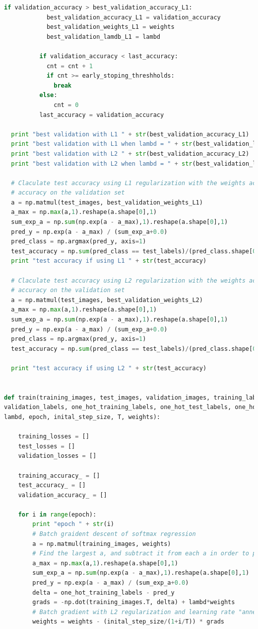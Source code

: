 \documentclass{article} %
\begin{document}
{\begin{lstlisting}[language=Python]
		  if validation_accuracy > best_validation_accuracy_L1:
			best_validation_accuracy_L1 = validation_accuracy
			best_validation_weights_L1 = weights
			best_validation_lamdb_L1 = lambd

		  if validation_accuracy < last_accuracy:
			cnt = cnt + 1
			if cnt >= early_stoping_threshholds:
			  break
		  else:
			  cnt = 0
		  last_accuracy = validation_accuracy

  print "best validation with L1 " + str(best_validation_accuracy_L1)
  print "best validation with L1 when lambd = " + str(best_validation_lamdb_L1)
  print "best validation with L2 " + str(best_validation_accuracy_L2)
  print "best validation with L2 when lambd = " + str(best_validation_lamdb_L2)

  # Claculate test accuracy using L1 regularization with the weights achieve highest 
  # accuracy on the validation set
  a = np.matmul(test_images, best_validation_weights_L1) 
  a_max = np.max(a,1).reshape(a.shape[0],1)
  sum_exp_a = np.sum(np.exp(a - a_max),1).reshape(a.shape[0],1)
  pred_y = np.exp(a - a_max) / (sum_exp_a+0.0) 
  pred_class = np.argmax(pred_y, axis=1)
  test_accuracy = np.sum(pred_class == test_labels)/(pred_class.shape[0]+0.0)
  print "test accuracy if using L1 " + str(test_accuracy) 

  # Claculate test accuracy using L2 regularization with the weights achieve highest 
  # accuracy on the validation set
  a = np.matmul(test_images, best_validation_weights_L2) 
  a_max = np.max(a,1).reshape(a.shape[0],1)
  sum_exp_a = np.sum(np.exp(a - a_max),1).reshape(a.shape[0],1) 
  pred_y = np.exp(a - a_max) / (sum_exp_a+0.0) 
  pred_class = np.argmax(pred_y, axis=1)
  test_accuracy = np.sum(pred_class == test_labels)/(pred_class.shape[0]+0.0)

  print "test accuracy if using L2 " + str(test_accuracy) 


def train(training_images, test_images, validation_images, training_labels, test_labels, \
validation_labels, one_hot_training_labels, one_hot_test_labels, one_hot_validation_labels, \
lambd, epoch, inital_step_size, T, weights):

	training_losses = []
	test_losses = []
	validation_losses = []

	training_accuracy_ = []
	test_accuracy_ = []
	validation_accuracy_ = []

	for i in range(epoch):
		print "epoch " + str(i)
		# Batch graident descent of softmax regression
		a = np.matmul(training_images, weights) 
		# Find the largest a, and subtract it from each a in order to prevent overflow
		a_max = np.max(a,1).reshape(a.shape[0],1)
		sum_exp_a = np.sum(np.exp(a - a_max),1).reshape(a.shape[0],1) 
		pred_y = np.exp(a - a_max) / (sum_exp_a+0.0) 
		delta = one_hot_training_labels - pred_y 
		grads = -np.dot(training_images.T, delta) + lambd*weights
		# Batch gradient with L2 regularization and learning rate "annealing"
		weights = weights - (inital_step_size/(1+i/T)) * grads


\end{lstlisting}}
\end{document}
